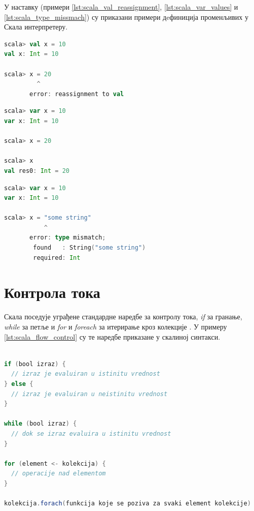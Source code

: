 \documentclass[12pt,oneside]{memoir}
\begin{document}
У наставку (примери \ref{lst:scala_val_reassignment}, \ref{lst:scala_var_values} и \ref{lst:scala_type_missmach}) су приказани примери дeфиниција променљивих у Скала интерпретеру.

\begin{lstlisting}[language=Scala, caption={Додељивање нове вредности val променљивима}, label={lst:scala_val_reassignment}]
scala> val x = 10
val x: Int = 10

scala> x = 20
         ^
       error: reassignment to val
\end{lstlisting}

\begin{lstlisting}[language=Scala, caption={Додељивање нове вредности var променљивима}, label={lst:scala_var_values}]
scala> var x = 10
var x: Int = 10

scala> x = 20

scala> x
val res0: Int = 20

\end{lstlisting}

\begin{lstlisting}[language=Scala, caption={Додељивање некомпатибилног типа}, label={lst:scala_type_missmach}]
scala> var x = 10
var x: Int = 10

scala> x = "some string"
           ^
       error: type mismatch;
        found   : String("some string")
        required: Int
\end{lstlisting}

\section{Контрола тока}
\label{sec:scala_kontr_toka}

Скала поседује уграђене стандардне наредбе за контролу тока, \textit{if} за гранање, \textit{while} за петље и \textit{for} и \textit{foreach} за итерирање кроз колекције \cite{scala_prog}. У примеру \ref{lst:scala_flow_control} су те наредбе приказане у скалиној синтакси.

\begin{lstlisting}[language=Scala, caption={Контрола тока}, label={lst:scala_flow_control}]

if (bool izraz) {
  // izraz je evaluiran u istinitu vrednost
} else {
  // izraz je evaluiran u neistinitu vrednost
}

while (bool izraz) {
  // dok se izraz evaluira u istinitu vrednost
}

for (element <- kolekcija) {
  // operacije nad elementom
}

kolekcija.forach(funkcija koje se poziva za svaki element kolekcije)

\end{lstlisting}
\end{document}
